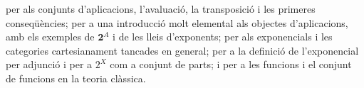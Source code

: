 \begin{resumcap}
 \cite[cap.~5 i §§7.1--7.2]{lawvere-rosebrugh} per als conjunts d'aplicacions, l'avaluació, la transposició i les primeres conseqüències; \cite[article~V, sessions~30--31]{lawvere-schanuel} per a una introducció molt elemental als objectes d'aplicacions, amb els exemples de \(\mathbf2^A\) i de les lleis d'exponents; \cite[cap.~6]{awodey} per als exponencials i les categories cartesianament tancades en general; \cite[pàg.~11--12]{bell2006} per a la definició de l'exponencial per adjunció i per a \(2^X\) com a conjunt de parts; i \cite[§8]{halmos} per a les funcions i el conjunt de funcions en la teoria clàssica.
\end{resumcap}
